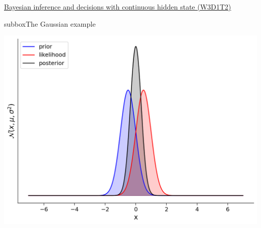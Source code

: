\begin{textbox}{\href{https://compneuro.neuromatch.io/tutorials/W3D1_BayesianDecisions/student/W3D1_Tutorial2.html}{Bayesian inference and decisions with continuous hidden state (W3D1T2)} }
\begin{subbox}{subbox}{The Gaussian example}
\begin{center}
    
\includegraphics[scale=0.23]{Figures/BD/BD_Figure11.png}
\end{center}

\end{subbox}
\end{textbox}
